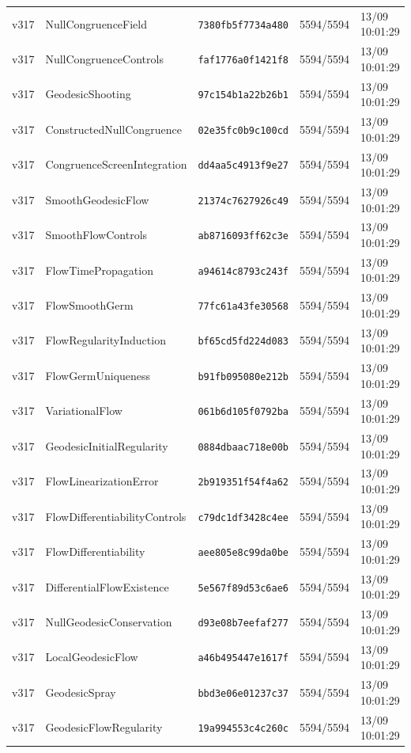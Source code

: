 \documentclass[11pt]{article}
\theoremstyle{definition}\newtheorem{deriv}{Derivation}
\begin{document}
{\begin{longtable}{@{}lllll@{}}
v317 & NullCongruenceField & \texttt{7380fb5f7734a480} & 5594/5594 & 13/09 10:01:29 \\
v317 & NullCongruenceControls & \texttt{faf1776a0f1421f8} & 5594/5594 & 13/09 10:01:29 \\
v317 & GeodesicShooting & \texttt{97c154b1a22b26b1} & 5594/5594 & 13/09 10:01:29 \\
v317 & ConstructedNullCongruence & \texttt{02e35fc0b9c100cd} & 5594/5594 & 13/09 10:01:29 \\
v317 & CongruenceScreenIntegration & \texttt{dd4aa5c4913f9e27} & 5594/5594 & 13/09 10:01:29 \\
v317 & SmoothGeodesicFlow & \texttt{21374c7627926c49} & 5594/5594 & 13/09 10:01:29 \\
v317 & SmoothFlowControls & \texttt{ab8716093ff62c3e} & 5594/5594 & 13/09 10:01:29 \\
v317 & FlowTimePropagation & \texttt{a94614c8793c243f} & 5594/5594 & 13/09 10:01:29 \\
v317 & FlowSmoothGerm & \texttt{77fc61a43fe30568} & 5594/5594 & 13/09 10:01:29 \\
v317 & FlowRegularityInduction & \texttt{bf65cd5fd224d083} & 5594/5594 & 13/09 10:01:29 \\
v317 & FlowGermUniqueness & \texttt{b91fb095080e212b} & 5594/5594 & 13/09 10:01:29 \\
v317 & VariationalFlow & \texttt{061b6d105f0792ba} & 5594/5594 & 13/09 10:01:29 \\
v317 & GeodesicInitialRegularity & \texttt{0884dbaac718e00b} & 5594/5594 & 13/09 10:01:29 \\
v317 & FlowLinearizationError & \texttt{2b919351f54f4a62} & 5594/5594 & 13/09 10:01:29 \\
v317 & FlowDifferentiabilityControls & \texttt{c79dc1df3428c4ee} & 5594/5594 & 13/09 10:01:29 \\
v317 & FlowDifferentiability & \texttt{aee805e8c99da0be} & 5594/5594 & 13/09 10:01:29 \\
v317 & DifferentialFlowExistence & \texttt{5e567f89d53c6ae6} & 5594/5594 & 13/09 10:01:29 \\
v317 & NullGeodesicConservation & \texttt{d93e08b7eefaf277} & 5594/5594 & 13/09 10:01:29 \\
v317 & LocalGeodesicFlow & \texttt{a46b495447e1617f} & 5594/5594 & 13/09 10:01:29 \\
v317 & GeodesicSpray & \texttt{bbd3e06e01237c37} & 5594/5594 & 13/09 10:01:29 \\
v317 & GeodesicFlowRegularity & \texttt{19a994553c4c260c} & 5594/5594 & 13/09 10:01:29 \\

\end{longtable}}
\end{document}
